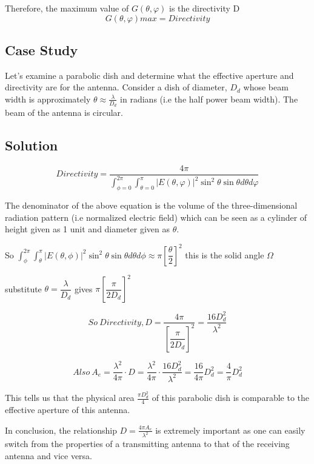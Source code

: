 Therefore, the maximum value of $G(\theta, \varphi)$ is the directivity D
$$G(\theta, \varphi)max=Directivity$$
\begin{exmp}
\section*{Case Study}
Let's examine a parabolic dish and determine what the effective aperture and directivity are for the antenna. Consider a dish of diameter, $D_{d}$ whose beam width is approximately $\theta\approx \frac{\lambda}{D_{d}}$ in radians (i.e the half power beam width). The beam of the antenna is circular.
\subsection*{\centering Solution}
$$Directivity=\dfrac{4\pi}{\int_{\phi=0}^{2\pi}\int_{\theta=0}^{\pi}|E(\theta,\varphi)|^{2}\sin^{2}\theta \sin\theta d\theta d\varphi} $$

The denominator of the above equation is the volume of the three-dimensional radiation pattern (i.e normalized electric field) which can be seen as a cylinder of height given as 1 unit and diameter given as $\theta$.

So $\int_{\phi}^{2\pi}\int_{\theta}^{\pi}|E(\theta,\phi)|^{2}\sin^{2}\theta \sin\theta d\theta d\phi \approx \pi\left[\dfrac{\theta}{2}\right]^{2}$ this is the solid angle $\Omega$

substitute $\theta = \dfrac{\lambda}{D_{d}}$ gives  $\pi\left[\dfrac{\pi}{2D_{d}}\right]^{2}$

$$So \ Directivity, D= \dfrac{4\pi}{\left[\dfrac{\pi}{2D_{d}}\right]^{2}} = \frac{16D_{d}^{2}}{\lambda^{2}}$$

$$Also \ A_{e}=\frac{\lambda^{2}}{4\pi} \cdot D = \frac{\lambda^{2}}{4\pi} \cdot \frac{16D_{d}^{2}}{\lambda^{2}} = \frac{16}{4\pi}D_{d}^{2} = \frac{4}{\pi}D_{d}^{2}$$

This tells us that the physical area $\frac{\pi D_d^2}{4}$ of this parabolic dish is comparable to the effective aperture of this antenna.
\end{exmp}

In conclusion, the relationship $D=\frac{4\pi A_{e}}{\lambda^{2}}$ is extremely important as one can easily switch from the properties of a transmitting antenna to that of the receiving antenna and vice versa.